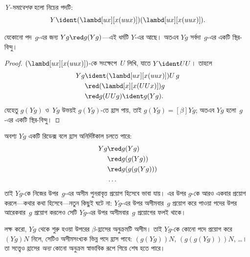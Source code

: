 \documentclass[../../../include/open-logic-section]{subfiles}
\begin{document}
\begin{defn}
  \emph{Y-সমাবেশক} হলো নিচের পদটি:
  \[
  Y \ident (\lambd[ux][x(uux)])(\lambd[ux][x(uux)]).
  \]
\end{defn}

\begin{thm}
  যেকোনো পদ~$g$-এর জন্য $Yg \red g(Yg)$---এই ধর্মটি $Y$-এর আছে। অতএব
  $Yg$ সর্বদা~$g$-এর একটি স্থির-বিন্দু।
\end{thm}

\begin{proof}
  $(\lambd[ux][x(uux)])$-কে সংক্ষেপে~$U$ লিখি, যাতে $Y \ident UU$। তাহলে
  \begin{align*}
    Y g &\ident (\lambd[ux][x(uux)])U\,g \\
    &\red (\lambd[x][x(UUx)])g\\
    & \red g(UUg) \ident g(Yg).
  \end{align*}
  যেহেতু $g(Yg)$ ও~$Yg$ উভয়ই $g(Yg)$-তে হ্রাস পায়, তাই $g(Yg)
  \equal[\beta] Yg$; অতএব $Yg$ হলো~$g$-এর একটি স্থির-বিন্দু।
\end{proof}

অবশ্য $Yg$ একটি রিডেক্স বলে হ্রাস অনির্দিষ্টকাল চলতে পারে:
\begin{align*}
  Y g &\red g (Y g) \\
    &\red g (g (Y g)) \\
    &\red g(g (g (Y g)))\\
    &\ldots
\end{align*}
তাই $Yg$-কে নিজের উপর~$g$-এর অসীম পুনরাবৃত্ত প্রয়োগ হিসেবে ভাবা যায়।
এর উপর $g$-কে আরও একবার প্রয়োগ করলে---কথার কথা হিসেবে---নতুন কিছুই ঘটে
না: $Yg$-এর উপর অসীমবার~$g$ প্রয়োগ করে পাওয়া পদের উপর আরেকবার~$g$
প্রয়োগ করলেও সেটি $Yg$-এর উপর অসীমবার~$g$ প্রয়োগের ফলই থাকে।

লক্ষ করো, $Yg$ থেকে শুরু হওয়া উপরের $\beta$-হ্রাসের অনুক্রমটি অসীম।
তাই $Yg$-কে কোনো পদে প্রয়োগ করে $(Yg)N$ নিলে, সেটিও অসীমসংখ্যক ভিন্ন
পদে হ্রাস পাবে: $(g(Yg))N$, $(g(g(Yg)))N$, \dots। তা সত্ত্বেও হ্রাসের
\emph{অন্য} কোনো অনুক্রম স্বাভাবিক রূপে গিয়ে শেষ হতে পারে।
\end{document}
